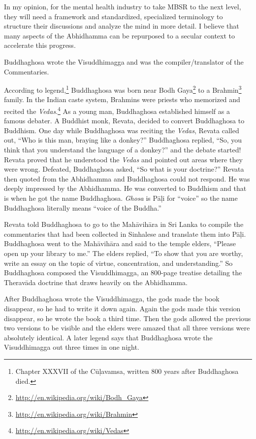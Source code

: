In my opinion, for the mental health industry to take MBSR to the next level, they will need a framework and standardized, specialized terminology to structure their discussions and analyze the mind in more detail. I believe that many aspects of the Abhidhamma can be repurposed to a secular context to accelerate this progress.

\pagebreak


Buddhaghosa wrote the Visuddhimagga and was the compiler/translator of the Commentaries.

According to legend,\footnote{Chapter XXXVII of the Cūḷavamsa, written 800 years after Buddhaghosa died.} Buddhaghosa was born near Bodh Gaya\footnote{\url{http://en.wikipedia.org/wiki/Bodh_Gaya}} to a Brahmin\footnote{\url{http://en.wikipedia.org/wiki/Brahmin}} family. In the Indian caste system, Brahmins were priests who memorized and recited the \textit{Vedas}.\footnote{\url{http://en.wikipedia.org/wiki/Vedas}} As a young man, Buddhaghosa established himself as a famous debater. A Buddhist monk, Revata, decided to convert Buddhaghosa to Buddhism. One day while Buddhaghosa was reciting the \textit{Vedas}, Revata called out, “Who is this man, braying like a donkey?” Buddhaghosa replied, “So, you think that you understand the language of a donkey?” and the debate started! Revata proved that he understood the \textit{Vedas} and pointed out areas where they were wrong. Defeated, Buddhaghosa asked, “So what is your doctrine?” Revata then quoted from the Abhidhamma and Buddhaghosa could not respond. He was deeply impressed by the Abhidhamma. He was converted to Buddhism and that is when he got the name Buddhaghosa. \textit{Ghosa} is Pāḷi for “voice” so the name Buddhaghosa literally means “voice of the Buddha.”

Revata told Buddhaghosa to go to the Mahāvihāra in Sri Lanka to compile the commentaries that had been collected in Sinhalese and translate them into Pāḷi. Buddhaghosa went to the Mahāvihāra and said to the temple elders, “Please open up your library to me.” The elders replied, “To show that you are worthy, write an essay on the topic of virtue, concentration, and understanding.” So Buddhaghosa composed the Visuddhimagga, an 800-page treatise detailing the Theravāda doctrine that draws heavily on the Abhidhamma.

After Buddhaghosa wrote the Visuddhimagga, the gods made the book disappear, so he had to write it down again. Again the gods made this version disappear, so he wrote the book a third time. Then the gods allowed the previous two versions to be visible and the elders were amazed that all three versions were absolutely identical. A later legend says that Buddhaghosa wrote the Visuddhimagga out three times in one night. 

